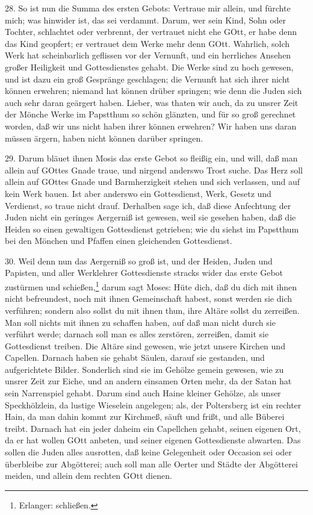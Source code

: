 28. So ist nun die Summa des ersten Gebots: Vertraue mir allein, und fürchte mich; was hinwider ist, das sei verdammt. Darum, wer sein Kind, Sohn oder Tochter, schlachtet oder verbrennt, der vertrauet nicht ehe GOtt, er habe denn das Kind geopfert; er vertrauet dem Werke mehr denn GOtt. Wahrlich, solch Werk hat scheinbarlich geflissen vor der Vernunft, und ein herrliches Ansehen großer Heiligkeit und Gottesdienstes gehabt. Die Werke sind zu hoch gewesen, und ist dazu ein groß Gespränge geschlagen; die Vernunft hat sich ihrer nicht können erwehren; niemand hat können drüber springen; wie denn die Juden sich auch sehr daran geärgert haben. Lieber, was thaten wir auch, da zu unsrer Zeit der Mönche Werke im Papstthum so schön glänzten, und für so groß gerechnet worden, daß wir uns nicht haben ihrer können erwehren? Wir haben uns daran müssen ärgern, haben nicht können darüber springen.

29. Darum bläuet ihnen Mosis das erste Gebot so fleißig ein, und will, daß man allein auf GOttes Gnade traue, und nirgend anderswo Trost suche. Das Herz soll allein auf GOttes Gnade und Barmherzigkeit stehen und sich verlassen, und auf kein Werk bauen. Ist aber anderswo ein Gottesdienst, Werk, Gesetz und Verdienst, so traue nicht drauf. Derhalben sage ich,
daß diese Anfechtung der Juden nicht ein geringes Aergerniß ist gewesen, weil sie gesehen haben, daß die Heiden so einen gewaltigen Gottesdienst getrieben; wie du siehst im Papstthum bei den Mönchen und Pfaffen einen gleichenden Gottesdienst.

30. Weil denn nun das Aergerniß so groß ist, und der Heiden, Juden und Papisten, und aller Werklehrer Gottesdienste stracks wider das erste Gebot zustürmen und schießen,\footnote{Erlanger: schließen.} darum sagt Moses: Hüte dich, daß du dich mit ihnen nicht befreundest, noch mit ihnen Gemeinschaft habest, sonst werden sie dich verführen; sondern also sollst du mit ihnen thun, ihre Altäre sollst du zerreißen. Man soll nichts mit ihnen zu schaffen haben, auf daß man nicht durch sie verführt werde; darnach soll man es alles zerstören, zerreißen, damit sie Gottesdienst treiben. Die Altäre sind gewesen, wie jetzt unsere Kirchen und Capellen. Darnach haben sie gehabt Säulen, darauf sie gestanden, und aufgerichtete Bilder. Sonderlich sind sie im Gehölze gemein gewesen, wie zu unsrer Zeit zur Eiche, und an andern einsamen Orten mehr, da der Satan hat sein Narrenspiel gehabt. Darum sind auch Haine kleiner Gehölze, als unser Speckhölzlein, da lustige Wieselein angelegen; als, der Poltersberg ist ein rechter Hain, da man dahin kommt zur Kirchmeß, säuft und frißt, und alle Büberei treibt. Darnach hat ein jeder daheim ein Capellchen gehabt, seinen eigenen Ort, da er hat wollen GOtt anbeten, und seiner eigenen Gottesdienste abwarten. Das sollen die Juden alles ausrotten, daß keine Gelegenheit oder Occasion sei oder überbleibe zur Abgötterei; auch soll man alle Oerter und Städte der Abgötterei meiden, und allein dem rechten GOtt dienen.

